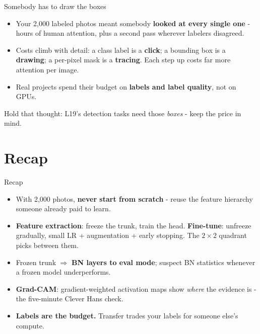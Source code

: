 \documentclass[aspectratio=169]{beamer}
\begin{document}
\begin{frame}{Somebody has to draw the boxes}
  \begin{itemize}
    \item Your 2,000 labeled photos meant somebody \textbf{looked at every single one} -
      hours of human attention, plus a second pass wherever labelers disagreed.
    \item Costs climb with detail: a class label is a \textbf{click}; a bounding box is a
      \textbf{drawing}; a per-pixel mask is a \textbf{tracing}. Each step up costs far
      more attention per image.
    \item Real projects spend their budget on \textbf{labels and label quality}, not on
      GPUs.
  \end{itemize}
  \vskip 8pt
  \vskip 6pt
  {\small Hold that thought: L19's detection tasks need those \emph{boxes} - keep the
  price in mind.}
\end{frame}

\section*{Recap}

\begin{frame}{Recap}
  \begin{itemize}
    \item With 2,000 photos, \textbf{never start from scratch} - reuse the feature
      hierarchy someone already paid to learn.
    \item \textbf{Feature extraction}: freeze the trunk, train the head.
      \textbf{Fine-tune}: unfreeze gradually, small LR + augmentation + early stopping.
      The $2\times2$ quadrant picks between them.
    \item Frozen trunk $\Rightarrow$ \textbf{BN layers to eval mode}; suspect BN
      statistics whenever a frozen model underperforms.
    \item \textbf{Grad-CAM}: gradient-weighted activation maps show \emph{where} the
      evidence is - the five-minute Clever Hans check.
    \item \textbf{Labels are the budget.} Transfer trades your labels for someone else's
      compute.
  \end{itemize}
  \vskip 6pt
\end{frame}
\end{document}
